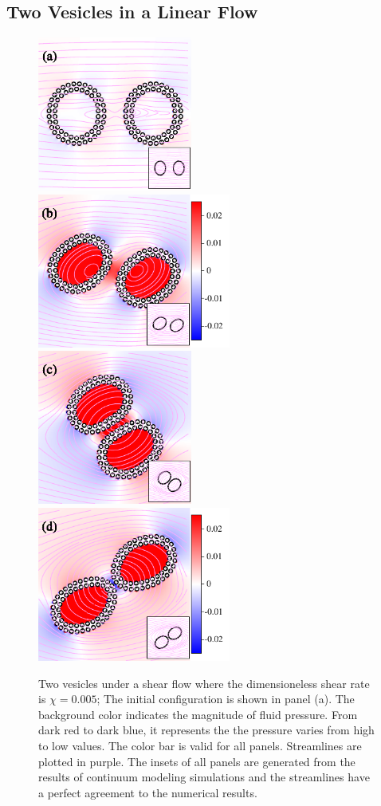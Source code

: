 \documentclass[lineno]{jfm}
\begin{document}
\subsection{Two Vesicles in a Linear Flow}


\begin{figure}
\centering
\includegraphics[height=2in]{N116_shear_0.pdf}
\includegraphics[height=2in]{N116_shear_2500.pdf}\\
\includegraphics[height=2in]{N116_shear_5000.pdf}
\includegraphics[height=2in]{N116_shear_7500.pdf}
  \caption{Two vesicles under a shear flow where the dimensioneless shear rate is $\chi=0.005$; The initial configuration is shown in panel (a). The background color indicates the magnitude of fluid pressure. From dark red to dark blue, it represents the the pressure varies from high to low values. The color bar is valid for all panels. Streamlines are plotted in purple. The insets of all panels are generated from the results of continuum modeling simulations and the streamlines have a perfect agreement to the numerical results.
  }
    \label{figure9}
\end{figure}
\end{document}
